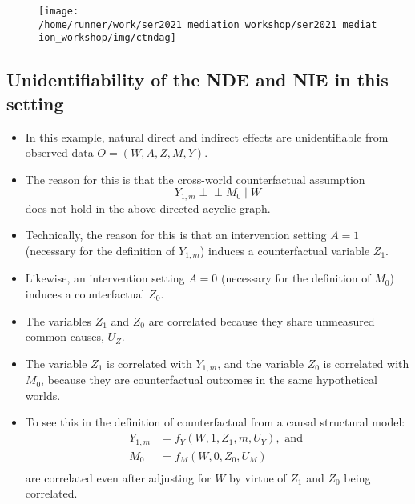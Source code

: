 \documentclass[
  12pt,
]{book}
\providecommand{\tightlist}{%
  \setlength{\itemsep}{0pt}\setlength{\parskip}{0pt}}
\theoremstyle{definition}
\theoremstyle{definition}
\theoremstyle{definition}
\newcommand{\indep}{\mbox{$\perp\!\!\!\perp$}}
\newcommand{\1}{\mathbbm{1}}
\begin{document}
\begin{figure}

{\centering \texttt{[image: /home/runner/work/ser2021\_mediation\_workshop/ser2021\_mediation\_workshop/img/ctndag]} 

}

\end{figure}

\hypertarget{unidentifiability-of-the-nde-and-nie-in-this-setting}{%
\subsection{Unidentifiability of the NDE and NIE in this setting}\label{unidentifiability-of-the-nde-and-nie-in-this-setting}}

\begin{itemize}
\tightlist
\item
  In this example, natural direct and indirect effects are unidentifiable from observed data \(O=(W,A,Z,M,Y)\).
\item
  The reason for this is that the cross-world counterfactual
  assumption
  \begin{equation*}
  Y_{1,m}\indep M_0\mid W
  \end{equation*}
  does not hold in the above directed acyclic graph.
\item
  Technically, the reason for this is that an intervention setting \(A=1\)
  (necessary for the definition of \(Y_{1,m}\)) induces a counterfactual variable
  \(Z_1\).
\item
  Likewise, an intervention setting \(A=0\) (necessary for the definition of
  \(M_0\)) induces a counterfactual \(Z_0\).
\item
  The variables \(Z_1\) and \(Z_0\) are correlated because they share unmeasured
  common causes, \(U_Z\).
\item
  The variable \(Z_1\) is correlated with \(Y_{1,m}\), and the variable \(Z_0\) is
  correlated with \(M_0\), because they are counterfactual outcomes in the same
  hypothetical worlds.
\item
  To see this in the definition of counterfactual from a causal structural
  model:
  \begin{align*}
  Y_{1,m} &= f_Y(W, 1, Z_1, m, U_Y), \text{ and }\\
  M_0 &= f_M(W, 0, Z_0, U_M)\\
  \end{align*}
  are correlated even after adjusting for \(W\) by virtue of \(Z_1\) and \(Z_0\) being
  correlated.
\end{itemize}
\end{document}
